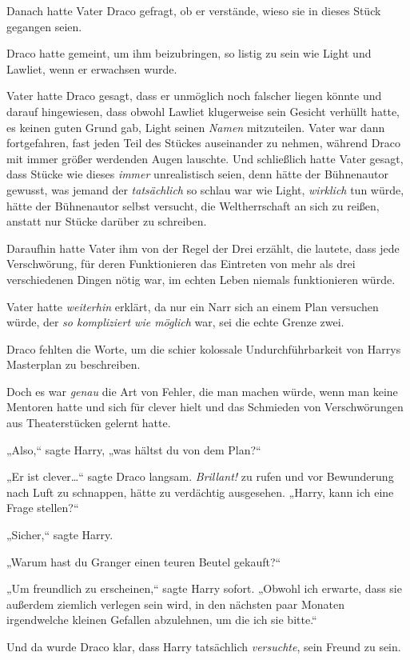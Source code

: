 {Danach hatte Vater Draco gefragt, ob er verstände, wieso sie in dieses Stück gegangen seien.

Draco hatte gemeint, um ihm beizubringen, so listig zu sein wie Light und Lawliet, wenn er erwachsen wurde.

Vater hatte Draco gesagt, dass er unmöglich noch falscher liegen könnte und darauf hingewiesen, dass obwohl Lawliet klugerweise sein Gesicht verhüllt hatte, es keinen guten Grund gab, Light seinen \emph{Namen} mitzuteilen. Vater war dann fortgefahren, fast jeden Teil des Stückes auseinander zu nehmen, während Draco mit immer größer werdenden Augen lauschte. Und schließlich hatte Vater gesagt, dass Stücke wie dieses \emph{immer} unrealistisch seien, denn hätte der Bühnenautor gewusst, was jemand der \emph{tatsächlich} so schlau war wie Light, \emph{wirklich} tun würde, hätte der Bühnenautor selbst versucht, die Weltherrschaft an sich zu reißen, anstatt nur Stücke darüber zu schreiben.

Daraufhin hatte Vater ihm von der Regel der Drei erzählt, die lautete, dass jede Verschwörung, für deren Funktionieren das Eintreten von mehr als drei verschiedenen Dingen nötig war, im echten Leben niemals funktionieren würde.

Vater hatte \emph{weiterhin} erklärt, da nur ein Narr sich an einem Plan versuchen würde, der \emph{so kompliziert wie möglich} war, sei die echte Grenze zwei.

Draco fehlten die Worte, um die schier kolossale Undurchführbarkeit von Harrys Masterplan zu beschreiben.

Doch es war \emph{genau} die Art von Fehler, die man machen würde, wenn man keine Mentoren hatte und sich für clever hielt und das Schmieden von Verschwörungen aus Theaterstücken gelernt hatte.

„Also,“ sagte Harry, „was hältst du von dem Plan?“

„Er ist clever…“ sagte Draco langsam. \emph{Brillant!} zu rufen und vor Bewunderung nach Luft zu schnappen, hätte zu verdächtig ausgesehen. „Harry, kann ich eine Frage stellen?“

„Sicher,“ sagte Harry.

„Warum hast du Granger einen teuren Beutel gekauft?“

„Um freundlich zu erscheinen,“ sagte Harry sofort. „Obwohl ich erwarte, dass sie außerdem ziemlich verlegen sein wird, in den nächsten paar Monaten irgendwelche kleinen Gefallen abzulehnen, um die ich sie bitte.“

Und da wurde Draco klar, dass Harry tatsächlich \emph{versuchte}, sein Freund zu sein.

}
